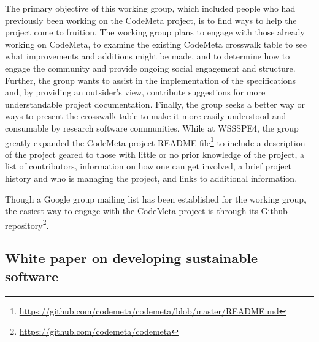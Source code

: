 \documentclass[11pt, oneside]{amsart}
\newcommand{\note}[1]{ {\textcolor{blueish}    { ***Note:      #1 }}}
\begin{document}
The primary objective of this working group, which included people who had previously been working on the CodeMeta project, is to find ways to help the project come to fruition.
%
The working group plans to engage with those already working on CodeMeta, to examine the existing CodeMeta crosswalk table to see what improvements and additions might be made, and to determine how to engage the community and provide ongoing social engagement and structure. Further, the group wants to assist in the implementation of the specifications and, by providing an outsider's view, contribute suggestions for more understandable project documentation. Finally, the group seeks a better way or ways to present the crosswalk table to make it more easily understood and consumable by research software communities.
%
While at WSSSPE4, the group greatly expanded the CodeMeta project README file\footnote{\url{https://github.com/codemeta/codemeta/blob/master/README.md}} to include a description of the project geared to those with little or no prior knowledge of the project, a list of contributors, information on how one can get involved, a brief project history and who is managing the project, and links to additional information.

Though a Google group mailing list has been established for the working group, the easiest way to engage with the CodeMeta project is through its Github repository\footnote{\url{https://github.com/codemeta/codemeta}}.


\subsection{White paper on developing sustainable software}
\label{sec:best-practices-developing}

\end{document}
